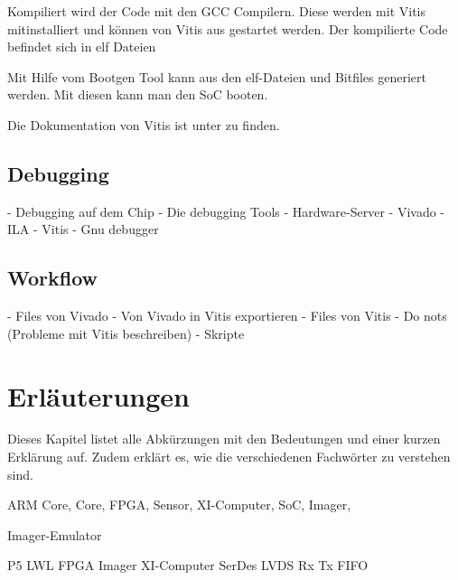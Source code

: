 \documentclass{article}
\begin{document}
Kompiliert wird der Code mit den GCC Compilern. Diese werden mit Vitis mitinstalliert und können von Vitis aus gestartet werden. Der kompilierte Code befindet sich in elf Dateien

Mit Hilfe vom Bootgen Tool kann aus den elf-Dateien und Bitfiles generiert werden. Mit diesen kann man den SoC booten.

Die Dokumentation von Vitis ist unter  zu finden.



\subsection{Debugging}
- Debugging auf dem Chip
- Die debugging Tools
    - Hardware-Server
    - Vivado
        - ILA
    - Vitis
        - Gnu debugger

\subsection{Workflow}
- Files von Vivado
- Von Vivado in Vitis exportieren
- Files von Vitis
- Do nots (Probleme mit Vitis beschreiben)
- Skripte


\section{Erläuterungen}
Dieses Kapitel listet alle Abkürzungen mit den Bedeutungen und einer kurzen Erklärung auf. Zudem erklärt es, wie die verschiedenen Fachwörter zu verstehen sind.

ARM Core,
Core,
FPGA,
Sensor,
XI-Computer,
SoC,
Imager,

Imager-Emulator

P5
LWL
FPGA
Imager
XI-Computer
SerDes
LVDS
Rx
Tx
FIFO
\end{document}
